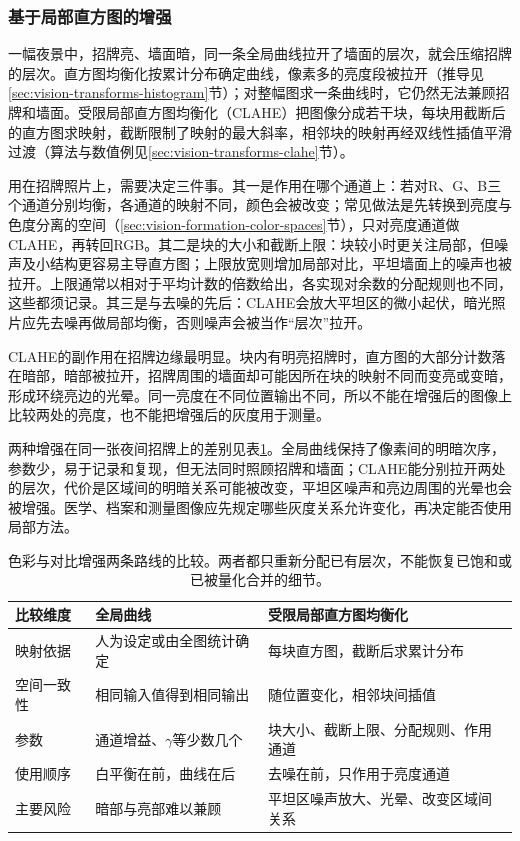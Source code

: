 \subsubsection{基于局部直方图的增强}
\label{sec:vision-restoration-clahe}

一幅夜景中，招牌亮、墙面暗，同一条全局曲线拉开了墙面的层次，就会压缩招牌的层次。直方图均衡化按累计分布确定曲线，像素多的亮度段被拉开（推导见\ref{sec:vision-transforms-histogram}节）；对整幅图求一条曲线时，它仍然无法兼顾招牌和墙面。受限局部直方图均衡化（CLAHE）把图像分成若干块，每块用截断后的直方图求映射，截断限制了映射的最大斜率，相邻块的映射再经双线性插值平滑过渡（算法与数值例见\ref{sec:vision-transforms-clahe}节）。

用在招牌照片上，需要决定三件事。其一是作用在哪个通道上：若对R、G、B三个通道分别均衡，各通道的映射不同，颜色会被改变；常见做法是先转换到亮度与色度分离的空间（\ref{sec:vision-formation-color-spaces}节），只对亮度通道做CLAHE，再转回RGB。其二是块的大小和截断上限：块较小时更关注局部，但噪声及小结构更容易主导直方图；上限放宽则增加局部对比，平坦墙面上的噪声也被拉开。上限通常以相对于平均计数的倍数给出，各实现对余数的分配规则也不同，这些都须记录。其三是与去噪的先后：CLAHE会放大平坦区的微小起伏，暗光照片应先去噪再做局部均衡，否则噪声会被当作“层次”拉开。

CLAHE的副作用在招牌边缘最明显。块内有明亮招牌时，直方图的大部分计数落在暗部，暗部被拉开，招牌周围的墙面却可能因所在块的映射不同而变亮或变暗，形成环绕亮边的光晕。同一亮度在不同位置输出不同，所以不能在增强后的图像上比较两处的亮度，也不能把增强后的灰度用于测量。

两种增强在同一张夜间招牌上的差别见表\ref{tab:vision-tone-compare}。全局曲线保持了像素间的明暗次序，参数少，易于记录和复现，但无法同时照顾招牌和墙面；CLAHE能分别拉开两处的层次，代价是区域间的明暗关系可能被改变，平坦区噪声和亮边周围的光晕也会被增强。医学、档案和测量图像应先规定哪些灰度关系允许变化，再决定能否使用局部方法。

\begin{table}[htbp]
 \centering
 \small
 \begin{tabularx}{\linewidth}{@{}p{16mm}XX@{}}
  \toprule
  比较维度 & 全局曲线 & 受限局部直方图均衡化\\
  \midrule
  映射依据 & 人为设定或由全图统计确定 & 每块直方图，截断后求累计分布\\
  空间一致性 & 相同输入值得到相同输出 & 随位置变化，相邻块间插值\\
  参数 & 通道增益、$\gamma$等少数几个 & 块大小、截断上限、分配规则、作用通道\\
  使用顺序 & 白平衡在前，曲线在后 & 去噪在前，只作用于亮度通道\\
  主要风险 & 暗部与亮部难以兼顾 & 平坦区噪声放大、光晕、改变区域间关系\\
  \bottomrule
 \end{tabularx}
 \caption{色彩与对比增强两条路线的比较。两者都只重新分配已有层次，不能恢复已饱和或已被量化合并的细节。}
 \label{tab:vision-tone-compare}
\end{table}

